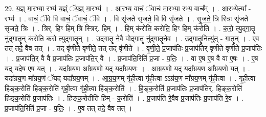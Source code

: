 \documentclass[17pt]{extarticle}
\begin{document}
29. य॒ज्ञ् मा॒रभ्या॒ रभ्य॑ य॒ज्ञ्ं ॅय॒ज्ञ् मा॒रभ्य॑ । . आ॒रभ्य॒ वाचं॒ ॅवाच॑ मा॒रभ्या॒ रभ्य॒ वाच᳚म् । . आ॒रभ्येत्या᳚ - रभ्य॑ । . वाचं॒ ॅवि वि वाचं॒ ॅवाचं॒ ॅवि । . वि सृ॑जते सृजते॒ वि वि सृ॑जते । . सृ॒ज॒ते॒ त्रि स्त्रिः सृ॑जते सृजते॒ त्रिः । . त्रिर्. हिꣳ हिम् त्रि स्त्रिर्. हिम् । . हिम् क॑रोति करोति॒ हिꣳ हिम् क॑रोति । . क॒रो॒ त्यु॒द्‍गा॒तॄ नु॑द्‍गा॒तॄन् क॑रोति करो त्युद्‍गा॒तॄन् । . उ॒द्‍गा॒तॄ ने॒वै वोद्‍गा॒तॄ नु॑द्‍गा॒तॄने॒व । . उ॒द्‍गा॒तॄनित्यु॑त् - गा॒तॄन् । . ए॒व तत् तदे॒ वैव तत् । . तद् वृ॑णीते वृणीते॒ तत् तद् वृ॑णीते । . वृ॒णी॒ते॒ प्र॒जाप॑तिः प्र॒जाप॑तिर् वृणीते वृणीते प्र॒जाप॑तिः । . प्र॒जाप॑ति॒र् वै वै प्र॒जाप॑तिः प्र॒जाप॑ति॒र् वै । . प्र॒जाप॑ति॒रिति॑ प्र॒जा - प॒तिः॒ । . वा ए॒ष ए॒ष वै वा ए॒षः । . ए॒ष यद् यदे॒ष ए॒ष यत् । . यदा᳚ग्रय॒ण आ᳚ग्रय॒णो यद् यदा᳚ग्रय॒णः । . आ॒ग्र॒य॒णो यद् यदा᳚ग्रय॒ण आ᳚ग्रय॒णो यत् । . यदा᳚ग्रय॒ण मा᳚ग्रय॒णं ॅयद् यदा᳚ग्रय॒णम् । . आ॒ग्र॒य॒णम् गृ॑ही॒त्वा गृ॑ही॒त्वा ऽऽग्र॑य॒ण मा᳚ग्रय॒णम् गृ॑ही॒त्वा । . गृ॒ही॒त्वा हि॑ङ्क॒रोति॑ हिङ्क॒रोति॑ गृही॒त्वा गृ॑ही॒त्वा हि॑ङ्क॒रोति॑ । . हि॒ङ्क॒रोति॑ प्र॒जाप॑तिः प्र॒जाप॑तिर्. हिङ्क॒रोति॑ हिङ्क॒रोति॑ प्र॒जाप॑तिः । . हि॒ङ्क॒रोतीति॑ हिम् - क॒रोति॑ । . प्र॒जाप॑ति रे॒वैव प्र॒जाप॑तिः प्र॒जाप॑ति रे॒व । . प्र॒जाप॑ति॒रिति॑ प्र॒जा - प॒तिः॒ । . ए॒व तत् तदे॒ वैव तत् । \newline
\end{document}
